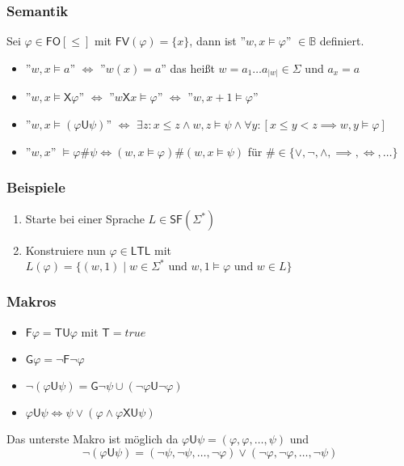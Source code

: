 \documentclass[12pt, german]{article}
\newcommand{\B}{\mathbb{B}}
\newcommand{\sigstern}{\Sigma^\ast}
\newcommand{\starfree}{\mathsf{SF}}
\newcommand{\fv}{\mathsf{FV}}
\newcommand{\fo}{\mathsf{FO}}
\newcommand{\ltl}{\mathsf{LTL}}
\newcommand{\sX}{\mathsf{X}}
\newcommand{\sF}{\mathsf{F}}
\newcommand{\sG}{\mathsf{G}}
\newcommand{\sT}{\mathsf{T}}
\newcommand{\sU}{\mathsf{U}}
\begin{document}
\subsubsection{Semantik}
	Sei $\varphi \in \fo[\leq]$ mit $\fv(\varphi) = \{x\}$, dann ist ''$w,x \models \varphi$'' $\in \B$ definiert.
	\begin{itemize}
		\item ''$w,x \models a$'' $\iff$ ''$w(x) = a$'' das heißt $w = a_1 \ldots a_{|w|} \in \Sigma$ und $a_x = a$
		\item ''$w,x \models \sX \varphi$'' $\iff$ ''$w\sX x \models \varphi$'' $\iff$ ''$w, x+1 \models \varphi$''
		\item ''$w, x \models (\varphi \sU \psi)$'' $\iff$ $\exists z : x \leq z \land w, z \models \psi \land \forall y: [x \leq y < z \implies w, y \models \varphi]$
		\item ''$w,x$'' $\models \varphi \#\psi \iff (w,x \models \varphi) \# (w,x \models \psi )$ für $\# \in \{\lor, \neg, \land, \implies, \iff, \ldots\}$
	\end{itemize}

\subsubsection{Beispiele}
		\begin{enumerate}[label=\arabic*.)]
			\item Starte bei einer Sprache $L \in \starfree(\sigstern)$
			\item Konstruiere nun $\varphi \in \ltl$ mit $L(\varphi) = \{(w,1) \mid w \in \sigstern \text{ und } w,1 \models \varphi \text{ und } w \in L\}$
		\end{enumerate}
\subsubsection{Makros}
		\begin{itemize}
		\item $\sF \varphi = \sT \sU \varphi$ mit $\sT = true$
		\item $\sG \varphi = \neg \sF \neg \varphi$
		\item $\neg(\varphi \sU \psi) = \sG \neg \psi \cup (\neg \varphi \sU \neg \varphi)$
		\item $\varphi \sU \psi \iff \psi \lor (\varphi \land \varphi\sX\sU\psi)$
	\end{itemize}
Das unterste Makro ist möglich da $\varphi \sU \psi = (\varphi, \varphi, \ldots,\psi)$ und $$\neg (\varphi \sU \psi) = (\neg \psi, \neg \psi, \ldots, \neg\varphi) \lor (\neg \varphi, \neg \varphi, \ldots, \neg\psi)$$
\end{document}
